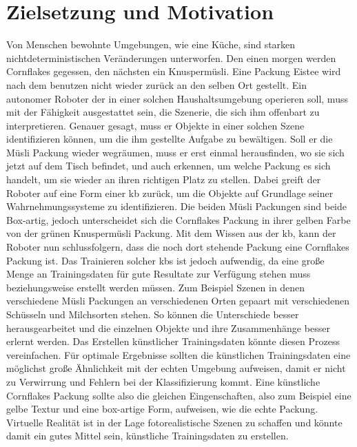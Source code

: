 \graphicspath{{./images/}}      
\def\CHAPTERONE{./chapters/Chapter-1} 

\chapter{Zielsetzung und Motivation}
\label{chap:motivation}
%	


Von Menschen bewohnte Umgebungen, wie eine Küche, sind starken nichtdeterministischen Veränderungen unterworfen. Den einen morgen werden Cornflakes gegessen, den nächsten ein Knuspermüsli. Eine Packung Eistee wird nach dem benutzen nicht wieder zurück an den selben Ort gestellt. Ein autonomer Roboter der in einer solchen Haushaltsumgebung operieren soll, muss mit der Fähigkeit ausgestattet sein, die Szenerie, die sich ihm offenbart zu interpretieren. Genauer gesagt, muss er Objekte in einer solchen Szene identifizieren können, um die ihm gestellte Aufgabe zu bewältigen. Soll er die Müsli Packung wieder wegräumen, muss er erst einmal herausfinden, wo sie sich jetzt auf dem Tisch befindet, und auch erkennen, um welche Packung es sich handelt, um sie wieder an ihren richtigen Platz zu stellen.  Dabei greift der Roboter auf eine Form einer \gls{kb} zurück, um die Objekte auf Grundlage seiner Wahrnehmungssysteme zu identifizieren. Die beiden Müsli Packungen sind beide Box-artig, jedoch unterscheidet sich die Cornflakes Packung in ihrer gelben Farbe von der grünen Knuspermüsli Packung. Mit dem Wissen aus der \gls{kb}, kann der Roboter nun schlussfolgern, dass die noch dort stehende Packung eine Cornflakes Packung ist. Das Trainieren solcher \glspl{kb} ist jedoch aufwendig, da eine große Menge an Trainingsdaten für gute Resultate zur Verfügung stehen muss beziehungsweise erstellt werden müssen. Zum Beispiel Szenen in denen verschiedene Müsli Packungen an verschiedenen Orten gepaart mit verschiedenen Schüsseln und Milchsorten stehen. So können die Unterschiede besser herausgearbeitet und die einzelnen Objekte und ihre Zusammenhänge besser erlernt werden. Das Erstellen künstlicher Trainingsdaten könnte diesen Prozess vereinfachen. Für optimale Ergebnisse sollten die künstlichen Trainingsdaten eine möglichst große Ähnlichkeit mit der echten Umgebung aufweisen, damit er nicht zu Verwirrung und Fehlern bei der Klassifizierung kommt. Eine künstliche Cornflakes Packung sollte also die gleichen Eingenschaften, also zum Beispiel eine gelbe Textur und eine box-artige Form, aufweisen, wie die echte Packung. Virtuelle Realität ist in der Lage fotorealistische Szenen zu schaffen und könnte damit ein gutes Mittel sein, künstliche Trainingsdaten zu erstellen.  

